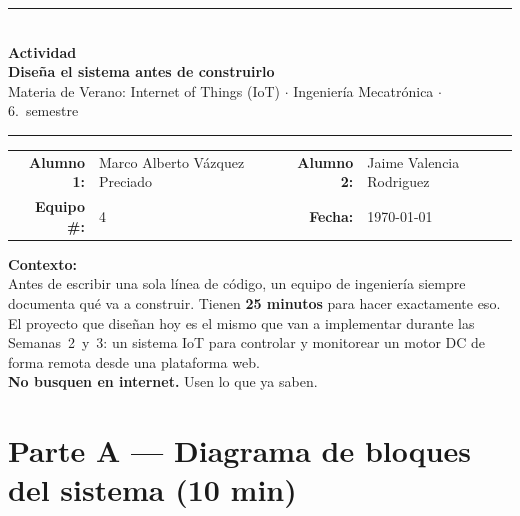 \documentclass[11pt, letterpaper]{article}
\newenvironment{contexto}{%
  \begin{mdframed}[backgroundcolor=roseLight, linecolor=roseMain, linewidth=1.5pt,
    innerleftmargin=12pt, innerrightmargin=12pt,
    innertopmargin=8pt,  innerbottommargin=8pt]
}{\end{mdframed}}
\begin{document}

\begin{center}
  {\color{upBlue}\rule{\linewidth}{1.5pt}}\\[0.3cm]
  {\Large\bfseries\color{upBlue} Actividad}\\[0.2cm]
  {\large\bfseries\color{roseMain}
    Dise\~na el sistema antes de construirlo}\\[0.15cm]
  {\normalsize Materia de Verano: Internet of Things (IoT)
    $\cdot$ Ingenier\'ia Mecatr\'onica $\cdot$ 6.\textdegree\ semestre}\\[0.3cm]
  {\color{roseMain}\rule{\linewidth}{0.8pt}}
\end{center}

\vspace{0.3cm}

\begin{tabular}{rl rl}
  \textbf{Alumno 1:}  & Marco Alberto Vázquez Preciado&
  \textbf{Alumno 2:}  & Jaime Valencia Rodriguez\\[0.5em]
  \textbf{Equipo \#:} & 4&
  \textbf{Fecha:}     & \today      \\
\end{tabular}

\vspace{0.4cm}

\begin{contexto}
  \textbf{\color{roseMain}Contexto:}\\[0.3em]
  Antes de escribir una sola l\'inea de c\'odigo, un equipo de ingenier\'ia siempre
  documenta qu\'e va a construir. Tienen \textbf{25 minutos} para hacer exactamente eso.
  El proyecto que dise\~nan hoy es el mismo que van a implementar durante las
  Semanas~2~y~3: un sistema IoT para controlar y monitorear un motor DC de forma remota
  desde una plataforma web.\\[0.5em]
  \textbf{No busquen en internet.} Usen lo que ya saben.
\end{contexto}

\vspace{0.3cm}

\section{Parte A --- Diagrama de bloques del sistema (10 min)}
\end{document}
